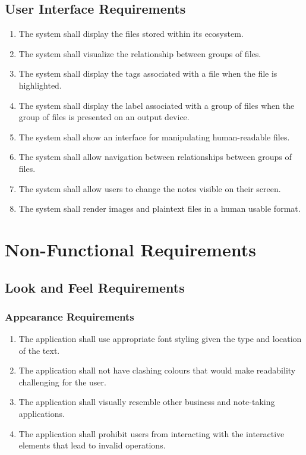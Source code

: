 \documentclass{article}
\begin{document}
\subsection{User Interface Requirements}
\begin{enumerate}[U{I}R1]
    \item The system shall display the files stored within its ecosystem.
    \item The system shall visualize the relationship between groups of files.
	\item The system shall display the tags associated with a file when the file is highlighted.
	\item The system shall display the label associated with a group of files when the group of files is presented on an output device.
    \item The system shall show an interface for manipulating human-readable files.
    \item The system shall allow navigation between relationships between groups of files.
    \item The system shall allow users to change the notes visible on their screen.
    \item The system shall render images and plaintext files in a human usable format.
\end{enumerate}

\section{Non-Functional Requirements}
\subsection{Look and Feel Requirements}
\subsubsection{Appearance Requirements}
\begin{enumerate}[{A}PR1]
    \item The application shall use appropriate font styling given the type and location of the text.
    \item The application shall not have clashing colours that would make readability challenging for the user.
    \item The application shall visually resemble other business and note-taking applications.
    \item The application shall prohibit users from interacting with the interactive elements that lead to invalid operations.
\end{enumerate}
\end{document}
